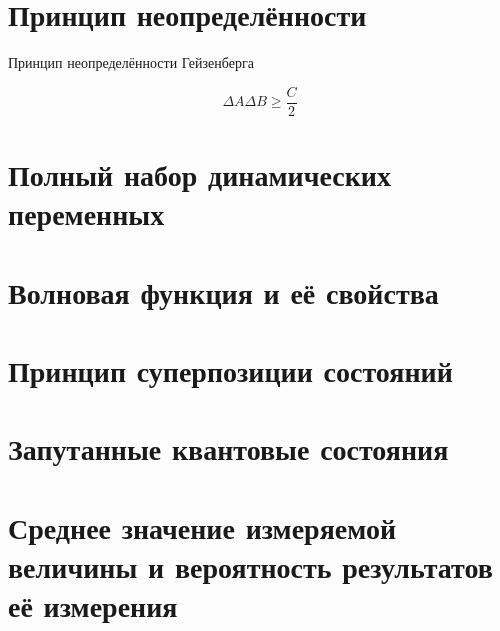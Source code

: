 \documentclass[12pt,a4paper]{article}
\begin{document}
\section[short]{Принцип неопределённости}

Принцип неопределённости Гейзенберга

\begin{equation*}
	\Delta A \Delta B \ge \frac{C}{2}
\end{equation*}


\begin{center}
\end{center}

\section[short]{Полный набор динамических переменных}

\section[short]{Волновая функция и её свойства}

\section[short]{Принцип суперпозиции состояний}

\section[short]{Запутанные квантовые состояния}

\section[short]{Среднее значение измеряемой величины и вероятность результатов её измерения}
\end{document}
